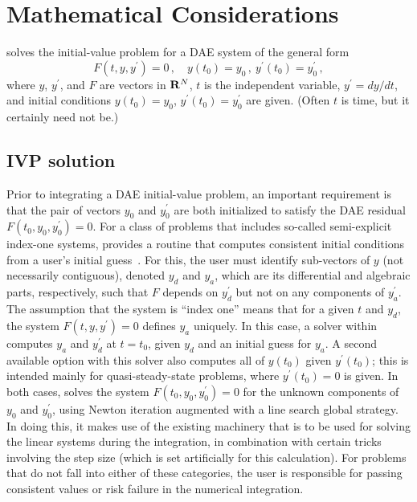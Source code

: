 \chapter{Mathematical Considerations}\label{s:math}

{\ida} solves the initial-value problem for 
a DAE system of the general form
\begin{equation}\label{e:DAE}
  F(t,y,y^\prime) = 0 \, ,
  \quad y(t_0) = y_0 \, ,~ y^\prime(t_0) = y^\prime_0 \, ,
\end{equation}
where $y$, $y^\prime$, and $F$ are vectors in ${\bf R}^N$, $t$ is the independent
variable, $y^\prime = dy/dt$, 
and initial conditions $y(t_0) = y_0$, $y^\prime(t_0) = y^\prime_0$ 
are given.  (Often $t$ is time, but it certainly need not be.)


\section{IVP solution}\label{ss:ivp_sol}

Prior to integrating a DAE initial-value problem, an important requirement 
is that the pair of vectors $y_0$ and $y^\prime_0$ are both initialized to
satisfy the DAE residual $F(t_0,y_0, y^\prime_0) = 0$.
For a class of problems that includes so-called
semi-explicit index-one systems, {\ida} provides a routine that computes
consistent initial conditions from a user's initial guess~\cite{BHP:98}.  
For this, the user must identify sub-vectors of $y$
(not necessarily contiguous), denoted $y_d$ and $y_a$, which are its
differential and algebraic parts, respectively, such that $F$ depends
on $y^\prime_d$ but not on any components of $y^\prime_a$.  The assumption that
the system is ``index one'' means that for a given $t$ and $y_d$, the
system $F(t,y,y^\prime) = 0$ defines $y_a$ uniquely.  In this case, a solver
within {\ida} computes $y_a$ and $y^\prime_d$ at $t = t_0$, given $y_d$ and an
initial guess for $y_a$.  A second available option with this solver
also computes all of $y(t_0)$ given $y^\prime(t_0)$; this is intended mainly
for quasi-steady-state problems, where $y^\prime(t_0) = 0$ is given.
In both cases, {\ida} solves the system $F(t_0,y_0, y^\prime_0) = 0$ for the
unknown components of $y_0$ and $y^\prime_0$, using Newton iteration
augmented with a line search global strategy.  In doing this, it makes
use of the existing machinery that is to be used for solving the
linear systems during the integration, in combination with certain
tricks involving the step size (which is set artificially for this
calculation).
For problems that do not fall into either of these categories, the
user is responsible for passing consistent values or risk failure in
the numerical integration.

